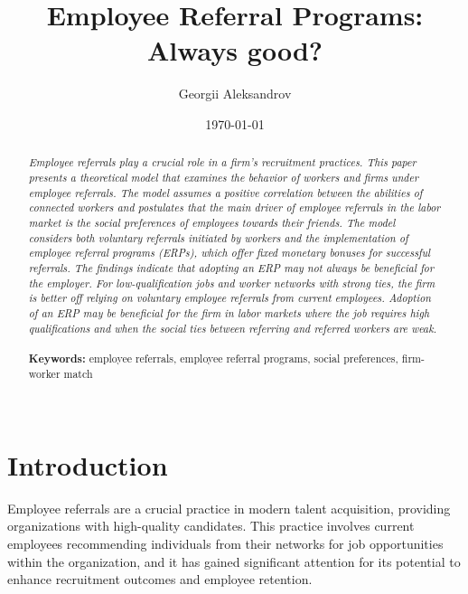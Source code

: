 \documentclass[12pt]{article}
\begin{document}
\begin{titlepage}
\title{Employee Referral Programs: Always good?}%
\author{Georgii Aleksandrov}%
\date{\today}
\maketitle
\begin{abstract}
\noindent \textit{Employee referrals play a crucial role in a firm's recruitment practices. This paper presents a theoretical model that examines the behavior of workers and firms under employee referrals. The model assumes a positive correlation between the abilities of connected workers and postulates that the main driver of employee referrals in the labor market is the social preferences of employees towards their friends. The model considers both voluntary referrals initiated by workers and the implementation of employee referral programs (ERPs), which offer fixed monetary bonuses for successful referrals. The findings indicate that adopting an ERP may not always be beneficial for the employer. For low-qualification jobs and worker networks with strong ties, the firm is better off relying on voluntary employee referrals from current employees. Adoption of an ERP may be beneficial for the firm in labor markets where the job requires high qualifications and when the social ties between referring and referred workers are weak.}\\
\vspace{0in}\\
\noindent\textbf{Keywords:} employee referrals, employee referral programs, social preferences, firm-worker match\\
\vspace{0in}\\

\bigskip
\end{abstract}
\setcounter{page}{0}
\thispagestyle{empty}
\end{titlepage}
\pagebreak \newpage




\doublespacing


\section{Introduction} \label{sec:introduction}

Employee referrals are a crucial practice in modern talent acquisition, providing organizations with high-quality candidates. This practice involves current employees recommending individuals from their networks for job opportunities within the organization, and it has gained significant attention for its potential to enhance recruitment outcomes and employee retention.
\end{document}
